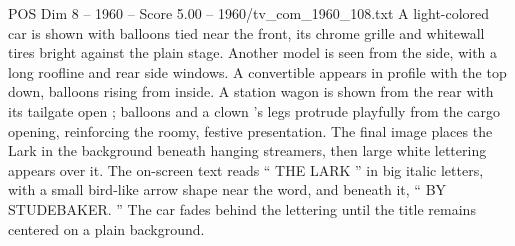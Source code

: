 \begin{textsample}{POS Dim 8 – 1960 – Score 5.00 – 1960/tv\_com\_1960\_108.txt}
A light-colored car is shown with balloons tied near the front, its chrome grille and whitewall tires bright against the plain stage.
Another model is seen from the side, with a long roofline and rear side windows.
A convertible appears in profile with the top down, balloons rising from inside.
A station wagon is shown from the rear with its tailgate open ; balloons and a clown ’s legs protrude playfully from the cargo opening, reinforcing the roomy, festive presentation.
The final image places the Lark in the background beneath hanging streamers, then large white lettering appears over it.
The on-screen text reads “ THE LARK ” in big italic letters, with a small bird-like arrow shape near the word, and beneath it, “ BY STUDEBAKER. ” The car fades behind the lettering until the title remains centered on a plain background.

\end{textsample}
